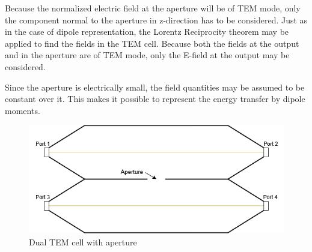 Because the normalized electric field at the aperture will be of TEM mode, only the component normal to the aperture in z-direction has to be considered. Just as in the case of dipole representation, the Lorentz Reciprocity theorem may be applied to find the fields in the TEM cell. Because both the fields at the output and in the aperture are of TEM mode, only the E-field at the output may be considered. 

Since the aperture is electrically small, the field quantities may be assumed to be constant over it. This makes it possible to represent the energy transfer by dipole moments. 

\begin{figure}[h]
    \centering
    \includegraphics[width=0.75\linewidth]{content//10_theory//img/dual_tem_cell.png}
    \caption{Dual TEM cell with aperture}
    \label{fig:dual_tem_cell}
\end{figure}

